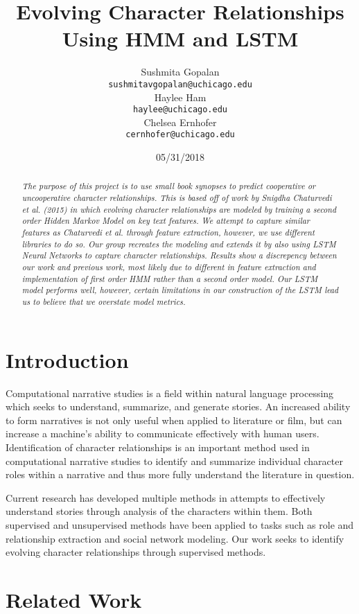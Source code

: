 \documentclass[11pt,a4paper]{article}
\title{Evolving Character Relationships Using HMM and LSTM}
\author{Sushmita Gopalan \\
  {\tt sushmitavgopalan@uchicago.edu} \\\And
  Haylee Ham \\
  {\tt haylee@uchicago.edu} \\\And
  Chelsea Ernhofer \\
  {\tt cernhofer@uchicago.edu} \\}
\date{05/31/2018}
\begin{document}
\maketitle
\begin{abstract}
  \textit{The purpose of this project is to use small book synopses to predict cooperative or uncooperative character relationships. This is based off of work by Snigdha Chaturvedi et al. (2015) in which evolving character relationships are modeled by training a second order Hidden Markov Model on key text features. We attempt to capture similar features as Chaturvedi et al. through feature extraction, however, we use different libraries to do so. Our group recreates the modeling and extends it by also using LSTM Neural Networks to capture character relationships. Results show a discrepency between our work and previous work, most likely due to different in feature extraction and implementation of first order HMM rather than a second order model. Our LSTM model performs well, however, certain limitations in our construction of the LSTM lead us to believe that we overstate model metrics.}
\end{abstract}

\section{Introduction}

Computational narrative studies is a field within natural language processing which seeks to understand, summarize, and generate stories. An increased ability to form narratives is not only useful when applied to literature or film, but can increase a machine's ability to communicate effectively with human users. Identification of character relationships is an important method used in computational narrative studies to identify and summarize individual character roles within a narrative and thus more fully understand the literature in question. 

Current research has developed multiple methods in attempts to effectively understand stories through analysis of the characters within them.  Both supervised and unsupervised methods have been applied to tasks such as role and relationship extraction and social network modeling. Our work seeks to identify evolving character relationships through supervised methods. 

\section{Related Work}
\end{document}
